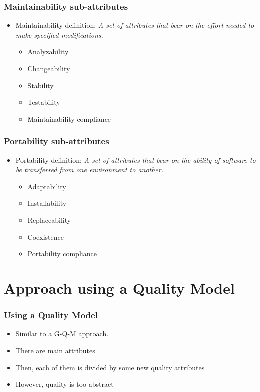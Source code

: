 \documentclass{beamer}
\begin{document}
\begin{frame}
 \frametitle{Maintainability sub-attributes}
 \begin{itemize}
 \item Maintainability definition: \textit{A set of attributes that bear on the effort needed to make specified modifications.}
 \begin{itemize}
 \item Analyzability
 \item Changeability
 \item Stability
 \item Testability
 \item Maintainability compliance

 \end{itemize}

 \end{itemize}
\end{frame}



\begin{frame}
 \frametitle{Portability sub-attributes}
 \begin{itemize}
 \item Portability definition: \textit{A set of attributes that bear on the ability of software to be transferred from one environment to another.}
 \begin{itemize}
 \item Adaptability
 \item Installability
 \item Replaceability
 \item Coexistence
 \item Portability compliance

 \end{itemize}

 \end{itemize}
\end{frame}


\section{Approach using a Quality Model}


\begin{frame}
\frametitle{Using a Quality Model}
\begin{center}
\begin{itemize}
 \item Similar to a G-Q-M approach.
 \item There are main attributes
 \item Then, each of them is divided by some new quality attributes
 \item However, quality is too abstract
\end{itemize}
\end{center}
\end{frame}
\end{document}
